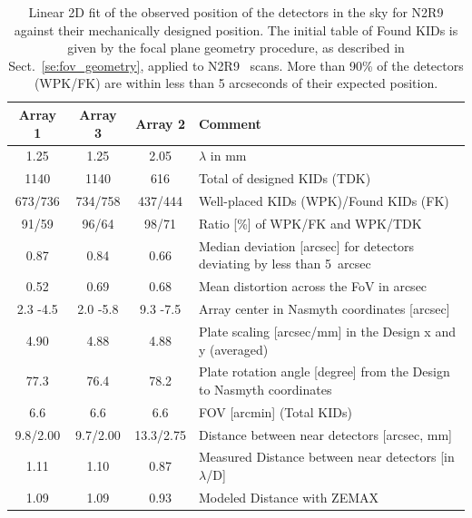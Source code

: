 \begin{table}[ht]
\label{ta:gridmatch}
\begin{center}
\begin{tabular}{|c|c|c|l|}
\hline
Array 1  &	Array 3   &	Array 2   &	Comment \\
\hline
1.25     &      1.25      &     2.05     &     \small{$\lambda$ in mm} \\
1140 	 &      1140 	   &        616  &     \small{Total of designed KIDs (TDK)} \\
673/736  &	734/758  &	437/444  &     \small{Well-placed KIDs (WPK)/Found KIDs (FK)} \\
91/59 	 &    96/64 	 &      98/71 	 & \small{Ratio [\%] of WPK/FK and WPK/TDK} \\
0.87 	 &     0.84 	  & 0.66     &	\small{Median deviation [arcsec] for detectors deviating by less than 5~arcsec} \\
0.52 	 &     0.69 	 &        0.68 	 & \small{Mean distortion across the FoV in arcsec} \\
2.3 -4.5  &	2.0 -5.8  &	9.3 -7.5  &	\small{Array center in Nasmyth coordinates [arcsec]} \\
4.90  &	4.88  &	4.88  &	\small{Plate scaling [arcsec/mm] in the Design x and y (averaged)} \\
77.3  &	76.4  &	78.2  &	\small{Plate rotation angle [degree] from the Design to Nasmyth coordinates} \\
6.6  &	6.6  &	6.6  &	\small{FOV [arcmin] (Total KIDs)} \\
9.8/2.00  &	9.7/2.00  &	13.3/2.75  &	\small{Distance between near detectors [arcsec, mm]} \\
1.11  &	1.10  &	0.87  &	\small{Measured Distance between near
  detectors [in $\lambda$/D] } \\
1.09  & 1.09  & 0.93  & \small{Modeled Distance with ZEMAX}\\
\hline
\end{tabular}
\end{center}
\caption[Field-of-view deformations]{Linear 2D fit of the observed
  position of the detectors in the sky for N2R9 against their mechanically
  designed position. The initial table of Found KIDs is given
  by the focal plane geometry procedure, as described in
  Sect.~\ref{se:fov_geometry},
  applied to N2R9 \bm\ scans. More than 90\% of the detectors (WPK/FK) are
  within less than 5 arcseconds of their expected position. }
\end{table}

